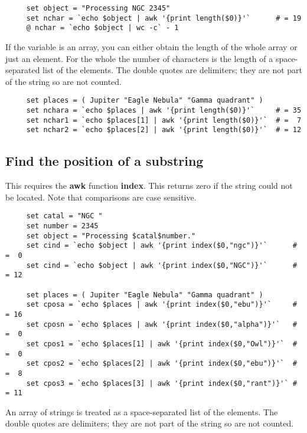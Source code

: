 \documentclass[twoside,11pt]{article}
\newcommand{\xlabel}[1]{}
\begin{document}
\small
\begin{verbatim}
     set object = "Processing NGC 2345"
     set nchar = `echo $object | awk '{print length($0)}'`      # = 19
     @ nchar = `echo $object | wc -c` - 1
\end{verbatim}
\normalsize

If the variable is an array, you can either obtain the length of the
whole array or just an element.  For the whole the number of
characters is the length of a space-separated list of the elements.
The double quotes are delimiters; they are not part of the string so
are not counted.

\small
\begin{verbatim}
     set places = ( Jupiter "Eagle Nebula" "Gamma quadrant" )
     set nchara = `echo $places | awk '{print length($0)}'`     # = 35
     set nchar1 = `echo $places[1] | awk '{print length($0)}'`  # =  7
     set nchar2 = `echo $places[2] | awk '{print length($0)}'`  # = 12
\end{verbatim}
\normalsize

\subsection{\xlabel{sc4_se_string_substr}Find the position of a
substring\label{sc4_se_string_substr}}

This requires the {\bf awk} function {\bf index}.  This returns zero if
the string could not be located.  Note that comparisons are case
sensitive.

\small
\begin{verbatim}
     set catal = "NGC "
     set number = 2345
     set object = "Processing $catal$number."
     set cind = `echo $object | awk '{print index($0,"ngc")}'`      # =  0
     set cind = `echo $object | awk '{print index($0,"NGC")}'`      # = 12

     set places = ( Jupiter "Eagle Nebula" "Gamma quadrant" )
     set cposa = `echo $places | awk '{print index($0,"ebu")}'`     # = 16
     set cposn = `echo $places | awk '{print index($0,"alpha")}'`   # =  0
     set cpos1 = `echo $places[1] | awk '{print index($0,"Owl")}'`  # =  0
     set cpos2 = `echo $places[2] | awk '{print index($0,"ebu")}'`  # =  8
     set cpos3 = `echo $places[3] | awk '{print index($0,"rant")}'` # = 11
\end{verbatim}
\normalsize
An array of strings is treated as a space-separated list of the elements.
The double quotes are delimiters; they are not part of the string so
are not counted.
\end{document}
